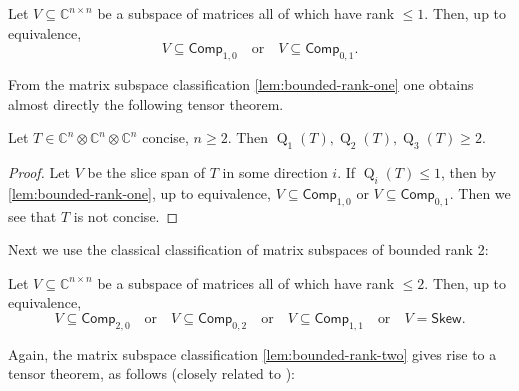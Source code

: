 \documentclass[11pt,a4paper]{article}
\numberwithin{equation}{section}
\DeclareMathOperator{\subrank}{Q}
\newcommand{\CC}{\mathbb{C}}
\newcommand{\Comp}{\mathsf{Comp}}
\newcommand{\Alt}{\mathsf{Skew}}
\begin{document}
\begin{lemma}\label{lem:bounded-rank-one}
	Let $V \subseteq \CC^{n\times n}$ be a subspace of matrices all of which have rank $\leq1$. Then, up to equivalence,
	\[
	V \subseteq \Comp_{1,0} \quad\text{or}\quad V\subseteq\Comp_{0,1}.
	\]
\end{lemma}
From the matrix subspace classification \cref{lem:bounded-rank-one} one obtains almost directly the following tensor theorem.
\begin{lemma}\label{lem:max-rank-at-least-2}
	Let $T \in \CC^n \otimes \CC^n \otimes \CC^n$ concise, $n\geq 2$. Then $\subrank_1(T), \subrank_2(T), \subrank_3(T) \geq 2$. %
\end{lemma}
\begin{proof}
	Let $V$ be the slice span of $T$ in some direction $i$. If $\subrank_i(T) \leq 1$, then by \cref{lem:bounded-rank-one}, up to equivalence, $V \subseteq \Comp_{1,0}$ or $V \subseteq \Comp_{0,1}$. Then we see that $T$ is not concise.
\end{proof}

Next we use the classical classification of matrix subspaces of bounded rank 2:

\begin{lemma}\label{lem:bounded-rank-two}
	Let $V \subseteq \CC^{n \times n}$ be a subspace of matrices all of which have rank $\leq 2$. Then, up to equivalence,
	\[
	V \subseteq \Comp_{2,0} \quad\text{or}\quad V \subseteq \Comp_{0,2} \quad\text{or}\quad V \subseteq \Comp_{1,1} \quad\text{or}\quad V = \Alt.
	\]
\end{lemma}

Again, the matrix subspace classification \cref{lem:bounded-rank-two} gives rise to a tensor theorem, as follows (closely related to \cite[Lemma~4.3]{gesmundo-zuiddam}):
\end{document}
